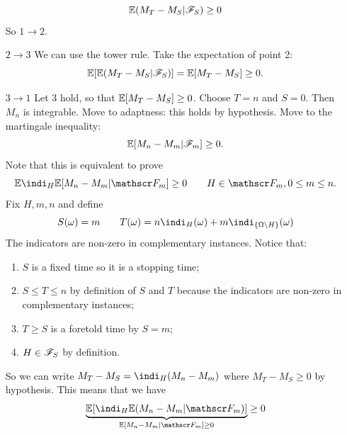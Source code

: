 \documentclass{report}
\begin{document}
\begin{fancyproof}
\begin{enumerate}
		\begin{equation*}
			\mathbb{E}(M_{T}-M_{S}|\mathscr{F}_{S})\geq 0
		\end{equation*}
		So $1\to2$.
		\item[$2\to3$] We can use the tower rule. Take the expectation of point 2:
		\[\mathbb{E}[\mathbb{E}(M_{T}-M_{S}|\mathscr{F}_{S})]=\mathbb{E}[M_{T}-M_{S}]\geq0.\]
		\item[$3\to1$] Let $3$ hold, so that $\mathbb{E}[M_{T}-M_{S}]\geq0$. Choose $T=n$ and $S=0$. Then
		$M_{n}$ is integrable. Move to adaptness: this holds by hypothesis. Move to the martingale inequality:
		\begin{equation*}
			\mathbb{E}[M_{n}-M_{m}|\mathscr{F}_{m}]\geq0.
		\end{equation*}
		Note that this is equivalent to prove 
		\begin{equation*}
			\ev\indi_H\ev[M_{n}-M_{m}|\F_{m}]\geq0\qquad H\in\F_{m},0\leq m\leq n.
		\end{equation*}
		Fix $H,m,n$ and define
		\begin{equation*}
			S(\omega)=m\qquad T(\omega)=n\indi_H(\omega)+m\indi_{\{\Omega\setminus H\}}(\omega)
		\end{equation*}
		The indicators are non-zero in complementary instances. Notice that:
		\begin{enumerate}
			\item $S$ is a fixed time so it is a stopping time;
			\item $S\leq T\leq n$ by definition of $S$ and $T$ because the indicators are non-zero in complementary instances;
			\item $T\geq S$ is a foretold time by $S=m$;
			\item $H\in\mathscr{F}_{S}$ by definition.
		\end{enumerate}
		So we can write $M_{T}-M_{S}=\indi_H(M_{n}-M_{m})$ where $M_{T}-M_{S}\geq0$ by hypothesis. This means that we have 
		\begin{equation*}
			\underbrace{\ev[\indi_{H}\ev(M_{n}-M_{m}|\F_{m})]}_{\ev[M_{n}-M_{m}|\F_{m}]\geq0}\geq0
		\end{equation*}
	\end{enumerate}
\end{fancyproof}
\end{document}
